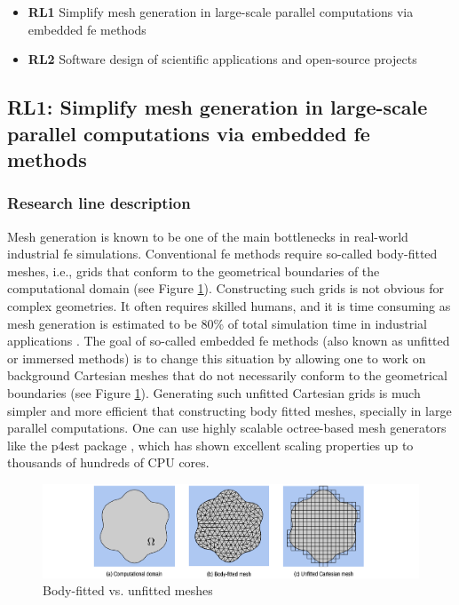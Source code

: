\documentclass{article}
\begin{document}
\begin{itemize}
\item {\bf RL1}  Simplify mesh generation in large-scale parallel computations via embedded \ac{fe} methods
\item {\bf RL2}  Software design of scientific applications and open-source projects
\end{itemize}

\subsection{RL1: Simplify mesh generation in large-scale parallel computations via embedded \ac{fe} methods}

\subsubsection{Research line description}


Mesh generation is known to be one of the main bottlenecks in real-world industrial \ac{fe} simulations. Conventional \ac{fe} methods require so-called body-fitted meshes, i.e., grids that conform to the geometrical boundaries of the computational domain (see Figure \ref{fig:fitted-vs-unfitted}). Constructing such grids is not obvious for complex geometries. It often requires skilled humans, and it is time consuming as mesh generation is estimated to be 80\% of total simulation time in industrial applications \cite{Cottrell2009}. The goal of so-called embedded \ac{fe} methods \cite{Badia2018,burman_cutfem:_2015,Schillinger2015} (also known as unfitted or immersed methods) is to change this situation by allowing one to work on background Cartesian meshes that do not necessarily conform to the geometrical boundaries (see Figure \ref{fig:fitted-vs-unfitted}). Generating such unfitted Cartesian grids is much simpler and more efficient that constructing body fitted meshes, specially in large parallel computations.  One can use highly scalable octree-based mesh generators like the p4est package \cite{burstedde_p4est_2011}, which has shown excellent scaling properties up to thousands of hundreds of CPU cores. 

\begin{figure}[ht!]
\includegraphics[width=\textwidth]{../_assets/fig1.png}
\caption{Body-fitted vs. unfitted meshes}
\label{fig:fitted-vs-unfitted}
\end{figure}
\end{document}
